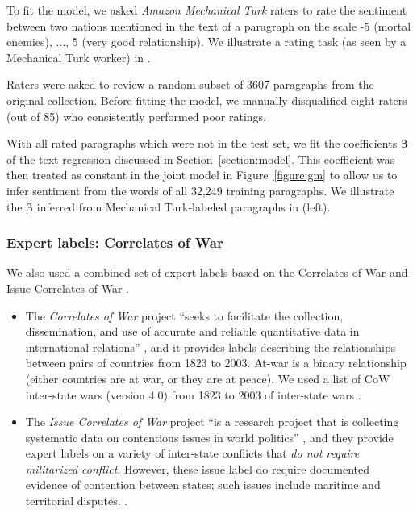 To fit the model, we asked \emph{Amazon Mechanical Turk} raters to
rate the sentiment between two nations mentioned in the text of a
paragraph on the scale -5 (mortal enemies), $\ldots$, 5 (very good
relationship). We illustrate a rating task (as seen by a Mechanical
Turk worker) in .

Raters were asked to review a random subset of 3607 paragraphs from
the original collection.  Before fitting the model, we manually
disqualified eight raters (out of 85) who consistently performed
poor ratings.

With all rated paragraphs which were not in the test set, we fit the
coefficients $\bm \beta$ of the text regression discussed in
Section~\ref{section:model}.  This coefficient was then treated as
constant in the joint model in Figure~\ref{figure:gm} to allow us to
infer sentiment from the words of all 32,249 training paragraphs.  We
illustrate the $\bm \beta$ inferred from Mechanical Turk-labeled
paragraphs in  (left).

\subsubsection{Expert labels: Correlates of War}
\label{section:correlates_of_war}

We also used a combined set of expert labels based on the Correlates of War \cite{sarkees:2010} and Issue Correlates of War \cite{hensel:2001}.
\begin{itemize}
  \item The \emph{Correlates of War} project ``seeks to facilitate the
    collection, dissemination, and use of accurate and reliable
    quantitative data in international relations''
    \cite{cow_webpage:2012}, and it provides labels describing the
    relationships between pairs of countries from 1823 to 2003.
    At-war is a binary relationship (either countries are at war, or
    they are at peace). We used a list of CoW inter-state wars
    (version 4.0) from 1823 to 2003 of inter-state wars
    \cite{sarkees:2010}.
  \item The \emph{Issue Correlates of War} project ``is a research
    project that is collecting systematic data on contentious issues
    in world politics'' \cite{icow_webpage:2012}, and they provide
    expert labels on a variety of inter-state conflicts that \emph{do
      not require militarized conflict}.  However, these issue label
    do require documented evidence of contention between states; such
    issues include maritime and territorial disputes.
    \cite{icow_webpage:2012,hensel:2001}.
\end{itemize}

